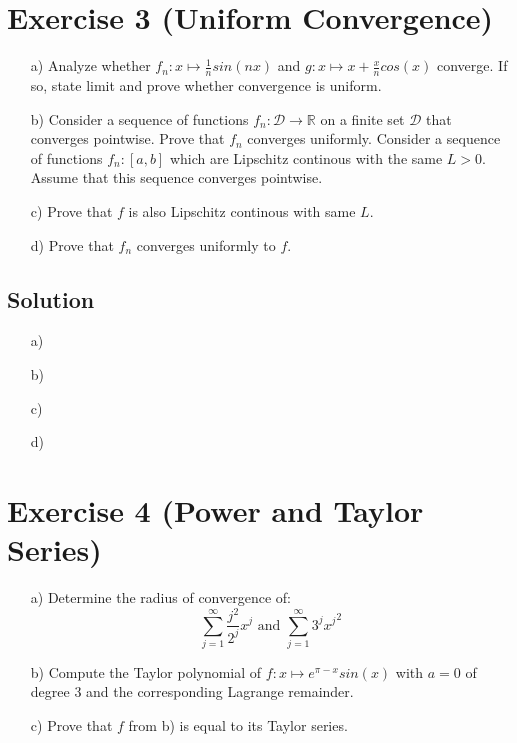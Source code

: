 \documentclass[10pt]{article}
\numberwithin{equation}{section}
\begin{document}
\section*{Exercise 3 (Uniform Convergence)}
\begin{enumerate}
\item[a)]{
    Analyze whether $f_n: x\mapsto \frac{1}{n}sin(nx)$ and $g: x \mapsto x + \frac{x}{n}cos(x)$ converge. If so, state limit and prove whether convergence is uniform.
  }
\item[b)]{
    Consider a sequence of functions $f_n: \mathcal{D} \rightarrow \mathbb{R}$ on a finite set $\mathcal{D}$ that converges pointwise. Prove that $f_n$ converges uniformly.
  }
Consider a sequence of functions $f_n: [a,b]$ which are Lipschitz continous with the same $L > 0$. Assume that this sequence converges pointwise.
\item[c)]{
    Prove that $f$ is also Lipschitz continous with same $L$.
  }
\item[d)]{
    Prove that $f_n$ converges uniformly to $f$.
  }
\end{enumerate}


\subsection*{Solution}
\begin{enumerate}
\item[a)]{
  }
\item[b)]{
  }
\item[c)]{
  }
\item[d)]{
  }
\end{enumerate}


\section*{Exercise 4 (Power and Taylor Series)}


\begin{enumerate}
\item[a)]{
    Determine the radius of convergence of:
    $$\sum_{j=1}^{\infty} \frac{j^2}{2^j}x^j \text{ and }\sum_{j=1}^{\infty} 3^j {x^j}^2$$
  }
\item[b)]{
    Compute the Taylor polynomial of $f: x \mapsto e^{\pi -x} sin(x)$ with $a=0$ of degree $3$ and the corresponding Lagrange remainder.
  }
\item[c)]{
    Prove that $f$ from b) is equal to its Taylor series.
  }
\end{enumerate}
\end{document}
